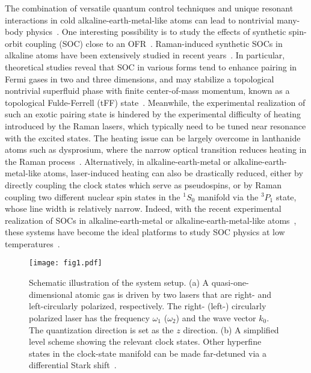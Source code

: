 \documentclass[a4paper, aps,pra, twocolumn, superscriptaddress, showpacs]{revtex4}
\begin{document}
The combination of versatile quantum control techniques and unique resonant interactions in cold alkaline-earth-metal-like atoms can lead to nontrivial many-body physics~\cite{zhang_kondo_2016,xu_reaching_2016,chen_polarons_2016}. One interesting possibility is to study the effects of synthetic spin-orbit coupling (SOC) close to an OFR~\cite{wall_synthetic_2016,livi_synthetic_2016,song_spin-orbit_2016,kolkowitz_spinorbit-coupled_2017,zhou_symmetry-protected_2016, iemini_majorana_2017}. Raman-induced synthetic SOCs in alkaline atoms have been extensively studied in recent years~\cite{galitski_spin-orbit_2013,zhang_fermi_2014,goldman_light-induced_2014,zhai_degenerate_2015,yi_pairing_2015}. In particular, theoretical studies reveal that SOC in various forms tend to enhance pairing in Fermi gases in two and three dimensions, and may stabilize a topological nontrivial superfluid phase with finite center-of-mass momentum, known as a topological Fulde-Ferrell (tFF) state~\cite{chen_inhomogeneous_2013, qu_topological_2013,zhang_topological_2013, liu_topological_2013}. Meanwhile, the experimental realization of such an exotic pairing state is hindered by the experimental difficulty of heating introduced by the Raman lasers, which typically need to be tuned near resonance with the excited states. The heating issue can be largely overcome in lanthanide atoms such as dysprosium, where the narrow optical transition reduces heating in the Raman process~\cite{cui_synthetic_2013,burdick_long-lived_2016}. Alternatively, in alkaline-earth-metal or alkaline-earth-metal-like atoms, laser-induced heating can also be drastically reduced, either by directly coupling the clock states which serve as pseudospins, or by Raman coupling two different nuclear spin states in the $^1S_0$ manifold via the $^3P_1$ state, whose line width is relatively narrow. Indeed, with the recent experimental realization of SOCs in alkaline-earth-metal or alkaline-earth-metal-like atoms~\cite{wall_synthetic_2016,livi_synthetic_2016,song_spin-orbit_2016,kolkowitz_spinorbit-coupled_2017}, these systems have become the ideal platforms to study SOC physics at low temperatures~\cite{zhou_symmetry-protected_2016, iemini_majorana_2017}.


\begin{figure}
\begin{centering}
\texttt{[image: fig1.pdf]}
\par\end{centering}
\caption{\label{fig:Scheme}Schematic illustration of the system setup. (a) A quasi-one-dimensional atomic gas is
driven by two lasers that are right- and left-circularly polarized, respectively. The right- (left-) circularly polarized laser has the frequency
$\omega_{1}$ ($\omega_{2}$) and the wave vector $k_{0}$. The quantization
direction is set as the $z$ direction. (b) A simplified level scheme showing the relevant clock states. Other hyperfine states in the clock-state manifold can be made far-detuned via a differential Stark shift~\cite{mancini_observation_2015,song_spin-orbit_2016}.}\label{fig:fig1}
\end{figure}
\end{document}
